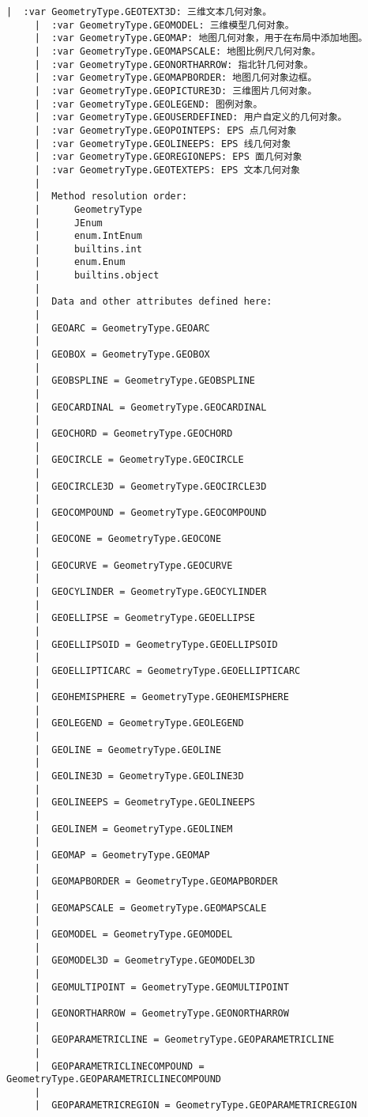\documentclass[11pt]{article}
\begin{document}
\begin{Verbatim}[commandchars=\\\{\}]
     |  :var GeometryType.GEOTEXT3D: 三维文本几何对象。
     |  :var GeometryType.GEOMODEL: 三维模型几何对象。
     |  :var GeometryType.GEOMAP: 地图几何对象，用于在布局中添加地图。
     |  :var GeometryType.GEOMAPSCALE: 地图比例尺几何对象。
     |  :var GeometryType.GEONORTHARROW: 指北针几何对象。
     |  :var GeometryType.GEOMAPBORDER: 地图几何对象边框。
     |  :var GeometryType.GEOPICTURE3D: 三维图片几何对象。
     |  :var GeometryType.GEOLEGEND: 图例对象。
     |  :var GeometryType.GEOUSERDEFINED: 用户自定义的几何对象。
     |  :var GeometryType.GEOPOINTEPS: EPS 点几何对象
     |  :var GeometryType.GEOLINEEPS: EPS 线几何对象
     |  :var GeometryType.GEOREGIONEPS: EPS 面几何对象
     |  :var GeometryType.GEOTEXTEPS: EPS 文本几何对象
     |  
     |  Method resolution order:
     |      GeometryType
     |      JEnum
     |      enum.IntEnum
     |      builtins.int
     |      enum.Enum
     |      builtins.object
     |  
     |  Data and other attributes defined here:
     |  
     |  GEOARC = GeometryType.GEOARC
     |  
     |  GEOBOX = GeometryType.GEOBOX
     |  
     |  GEOBSPLINE = GeometryType.GEOBSPLINE
     |  
     |  GEOCARDINAL = GeometryType.GEOCARDINAL
     |  
     |  GEOCHORD = GeometryType.GEOCHORD
     |  
     |  GEOCIRCLE = GeometryType.GEOCIRCLE
     |  
     |  GEOCIRCLE3D = GeometryType.GEOCIRCLE3D
     |  
     |  GEOCOMPOUND = GeometryType.GEOCOMPOUND
     |  
     |  GEOCONE = GeometryType.GEOCONE
     |  
     |  GEOCURVE = GeometryType.GEOCURVE
     |  
     |  GEOCYLINDER = GeometryType.GEOCYLINDER
     |  
     |  GEOELLIPSE = GeometryType.GEOELLIPSE
     |  
     |  GEOELLIPSOID = GeometryType.GEOELLIPSOID
     |  
     |  GEOELLIPTICARC = GeometryType.GEOELLIPTICARC
     |  
     |  GEOHEMISPHERE = GeometryType.GEOHEMISPHERE
     |  
     |  GEOLEGEND = GeometryType.GEOLEGEND
     |  
     |  GEOLINE = GeometryType.GEOLINE
     |  
     |  GEOLINE3D = GeometryType.GEOLINE3D
     |  
     |  GEOLINEEPS = GeometryType.GEOLINEEPS
     |  
     |  GEOLINEM = GeometryType.GEOLINEM
     |  
     |  GEOMAP = GeometryType.GEOMAP
     |  
     |  GEOMAPBORDER = GeometryType.GEOMAPBORDER
     |  
     |  GEOMAPSCALE = GeometryType.GEOMAPSCALE
     |  
     |  GEOMODEL = GeometryType.GEOMODEL
     |  
     |  GEOMODEL3D = GeometryType.GEOMODEL3D
     |  
     |  GEOMULTIPOINT = GeometryType.GEOMULTIPOINT
     |  
     |  GEONORTHARROW = GeometryType.GEONORTHARROW
     |  
     |  GEOPARAMETRICLINE = GeometryType.GEOPARAMETRICLINE
     |  
     |  GEOPARAMETRICLINECOMPOUND = GeometryType.GEOPARAMETRICLINECOMPOUND
     |  
     |  GEOPARAMETRICREGION = GeometryType.GEOPARAMETRICREGION

\end{Verbatim}
\end{document}
